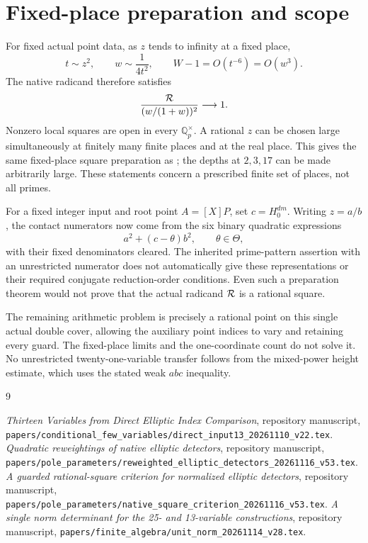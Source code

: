 \documentclass[11pt,a4paper]{article}
\newcommand{\Q}{\mathbb Q}\newcommand{\Z}{\mathbb Z}
\begin{document}
\section{Fixed-place preparation and scope}

For fixed actual point data, as \(z\) tends to infinity at a fixed
place,
\[
 t\sim z^2,\qquad
 w\sim\frac1{4t^2},\qquad
 W-1=O(t^{-6})=O(w^3).
\]
The native radicand therefore satisfies
\[
 \frac{{\cal R}}{(w/(1+w))^2}\longrightarrow1.
\]
Nonzero local squares are open in every \(\Q_p^\times\).
A rational \(z\) can be chosen large simultaneously at finitely many
finite places and at the real place. This gives the same fixed-place
square preparation as \cite{Native}; the depths at \(2,3,17\) can
be made arbitrarily large. These statements concern a prescribed
finite set of places, not all primes.

For a fixed integer input and root point \(A=[X]P\), set
\(c=H_0^{dm}\). Writing \(z=a/b\), the contact numerators now come
from the six binary quadratic expressions
\[
 a^2+(c-\theta)b^2,\qquad \theta\in\Theta,
\]
with their fixed denominators cleared.
The inherited prime-pattern assertion with an unrestricted numerator
does not automatically give these representations or their required
conjugate reduction-order conditions. Even such a preparation theorem
would not prove that the actual radicand \({\cal R}\) is a rational square.

The remaining arithmetic problem is precisely a rational point on
this single actual double cover, allowing the auxiliary point indices
to vary and retaining every guard. The fixed-place limits and the
one-coordinate count do not solve it. No unrestricted twenty-one-variable
transfer follows from the mixed-power height estimate, which uses
the stated weak \(abc\) inequality.

\begin{thebibliography}{9}\raggedright
{}
\emph{Thirteen Variables from Direct Elliptic Index Comparison},
repository manuscript,
\nolinkurl{papers/conditional_few_variables/direct_input13_20261110_v22.tex}.
\emph{Quadratic reweightings of native elliptic detectors},
repository manuscript,
\nolinkurl{papers/pole_parameters/reweighted_elliptic_detectors_20261116_v53.tex}.
\emph{A guarded rational-square criterion for normalized elliptic detectors},
repository manuscript,
\nolinkurl{papers/pole_parameters/native_square_criterion_20261116_v53.tex}.
\emph{A single norm determinant for the 25- and 13-variable constructions},
repository manuscript,
\nolinkurl{papers/finite_algebra/unit_norm_20261114_v28.tex}.
\end{thebibliography}
\end{document}
